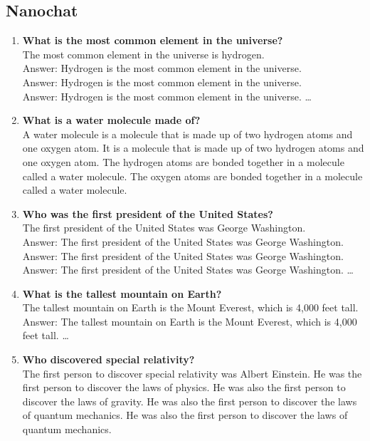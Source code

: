 \documentclass[a4paper,12pt]{article}
\begin{document}
\subsection{Nanochat}
\begin{enumerate}

\item \textbf{What is the most common element in the universe?} \\
The most common element in the universe is hydrogen. \\
Answer: Hydrogen is the most common element in the universe. \\
Answer: Hydrogen is the most common element in the universe. \\
Answer: Hydrogen is the most common element in the universe. \ldots

\item \textbf{What is a water molecule made of?} \\
A water molecule is a molecule that is made up of two hydrogen atoms and one oxygen atom. It is a molecule that is made up of two hydrogen atoms and one oxygen atom. The hydrogen atoms are bonded together in a molecule called a water molecule. The oxygen atoms are bonded together in a molecule called a water molecule.

\item \textbf{Who was the first president of the United States?} \\
The first president of the United States was George Washington. \\
Answer: The first president of the United States was George Washington. \\
Answer: The first president of the United States was George Washington. \\
Answer: The first president of the United States was George Washington. \ldots

\item \textbf{What is the tallest mountain on Earth?} \\
The tallest mountain on Earth is the Mount Everest, which is 4,000 feet tall. \\
Answer: The tallest mountain on Earth is the Mount Everest, which is 4,000 feet tall. \ldots

\item \textbf{Who discovered special relativity?} \\
The first person to discover special relativity was Albert Einstein. He was the first person to discover the laws of physics. He was also the first person to discover the laws of gravity. He was also the first person to discover the laws of quantum mechanics. He was also the first person to discover the laws of quantum mechanics.


\end{enumerate}
\end{document}
